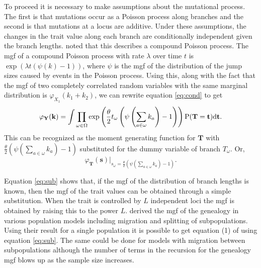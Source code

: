 To proceed it is necessary to make assumptions about the mutational process. The
first is that mutations occur as a Poisson process along branches and the second
is that mutations at a locus are additive. Under these assumptions, the changes
in the trait value along each branch are conditionally independent given the
branch lengths. \citet{Khaitovich2005} noted that this describes a compound
Poisson process. The mgf of a compound Poisson process with rate $\lambda$ over
time $t$ is $\exp(\lambda t (\psi(k)-1))$, where $\psi$ is the mgf of the
distribution of the jump sizes caused by events in the Poisson process. Using
this, along with the fact that the mgf of two completely correlated random
variables with the same marginal distribution is $\varphi_{X_1}(k_1+k_2)$, we
can rewrite equation \eqref{eq:cond} to get
\begin{equation}
  \label{eq:fullmgf}
  \varphi_{\mathbf{Y}}(\mathbf{k}) = 
  \int \prod_{\omega \in \Omega} \exp\left( \frac{\theta}{2} t_{\omega} \left( \psi\left(\sum_{a \in \omega}k_{a}\right) -1 \right)\right)
  \mathrm{P}(\mathbf{T}=\mathbf{t})\mbox{d}\mathbf{t}.
\end{equation}
This can be recognized as the moment generating function for $\mathbf{T}$ with
$\frac{\theta}{2} \left( \psi(\sum_{a \in \omega}k_{a}) -1 \right)$ substituted
for the dummy variable of branch $T_{\omega}$. Or,
\begin{equation}
  \label{eq:sub}
  \varphi_{\mathbf{T}}(\mathbf{s})\Bigr|_{s_{\omega}=\frac{\theta}{2} \left( \psi\left(\sum_{a \in \omega}k_{a}\right) -1 \right)}.
\end{equation}

Equation \eqref{eq:sub} shows that, if the mgf of the distribution of branch
lengths is known, then the mgf of the trait values can be obtained through a
simple substitution. When the trait is controlled by $L$ independent loci the
mgf is obtained by raising this to the power $L$. \citet{Lohse2011} derived the
mgf of the genealogy in various population models including migration and
splitting of subpopulations. Using their result for a single population it is
possible to get equation (1) of \citet{Schraiber2015} using equation
\eqref{eq:sub}. The same could be done for models with migration between
subpopulations although the number of terms in the recursion for the genealogy
mgf blows up as the sample size increases. 


